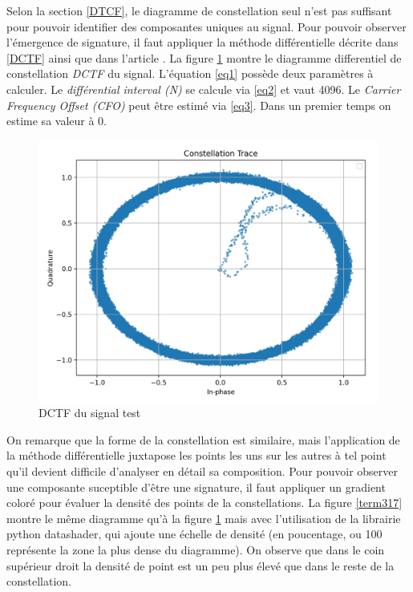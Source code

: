 Selon la section \ref{DTCF}, le diagramme de constellation seul n'est pas suffisant pour pouvoir identifier des composantes uniques au signal. Pour pouvoir observer l'émergence de signature, il faut appliquer la méthode différentielle décrite dans \ref{DCTF} ainsi que dans l'article \cite{loraDCTF}. La figure \ref{term316} montre le diagramme differentiel de constellation \textit{DCTF} du signal. L'équation \ref{eq1} possède deux paramètres à calculer. Le \textit{différential interval (N)} se calcule via \ref{eq2} et vaut 4096. Le \textit{Carrier Frequency Offset (CFO)} peut être estimé via \ref{eq3}. Dans un premier temps on estime sa valeur à 0.

\begin{figure}[h]
\centering

\includegraphics[scale=0.18]{images/dctf3.png}
\caption{DCTF du signal test}\label{term316}
\end{figure}

On remarque que la forme de la constellation est similaire, mais l'application de la méthode différentielle juxtapose les points les uns sur les autres à tel point qu'il devient difficile d'analyser en détail sa composition. Pour pouvoir observer une composante suceptible d'être une signature, il faut appliquer un gradient coloré pour évaluer la densité des points de la constellations. La figure \ref{term317} montre le même diagramme qu'à la figure \ref{term316} mais avec l'utilisation de la librairie python datashader, qui ajoute une échelle de densité (en poucentage, ou 100 représente la zone la plus dense du diagramme). On observe que dans le coin supérieur droit la densité de point est un peu plus élevé que dans le reste de la constellation.

